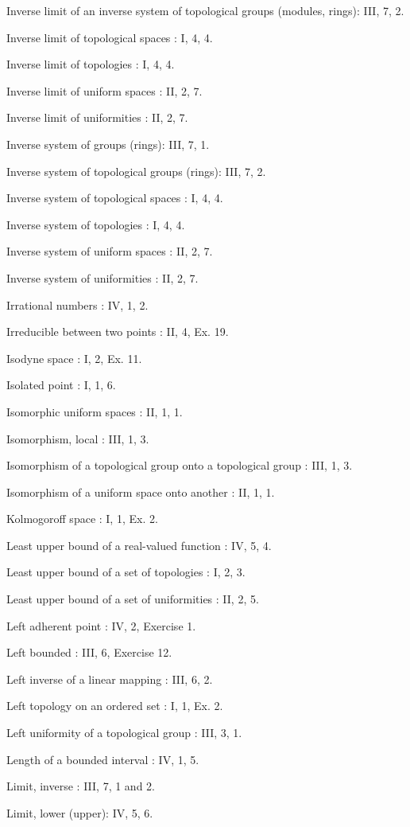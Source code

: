Inverse limit of an inverse system of topological groups (modules, rings): III, 7, 2.

Inverse limit of topological spaces : I, 4, 4.

Inverse limit of topologies : I, 4, 4.

Inverse limit of uniform spaces : II, 2, 7.

Inverse limit of uniformities : II, 2, 7.

Inverse system of groups (rings): III, 7, 1.

Inverse system of topological groups (rings): III, 7, 2.

Inverse system of topological spaces : I, 4, 4.

Inverse system of topologies : I, 4, 4.

Inverse system of uniform spaces : II, 2, 7.

Inverse system of uniformities : II, 2, 7.

Irrational numbers : IV, 1, 2.

Irreducible between two points : II, 4, Ex. 19.

Isodyne space : I, 2, Ex. 11.

Isolated point : I, 1, 6.

Isomorphic uniform spaces : II, 1, 1.

Isomorphism, local : III, 1, 3.

Isomorphism of a topological group onto a topological group : III, 1, 3.

Isomorphism of a uniform space onto another : II, 1, 1.

Kolmogoroff space : I, 1, Ex. 2.

Least upper bound of a real-valued function : IV, 5, 4.

Least upper bound of a set of topologies : I, 2, 3.

Least upper bound of a set of uniformities : II, 2, 5.

Left adherent point : IV, 2, Exercise 1.

Left bounded : III, 6, Exercise 12.

Left inverse of a linear mapping : III, 6, 2.

Left topology on an ordered set : I, 1, Ex. 2.

Left uniformity of a topological group : III, 3, 1.

Length of a bounded interval : IV, 1, 5.

Limit, inverse : III, 7, 1 and 2.

Limit, lower (upper): IV, 5, 6.

